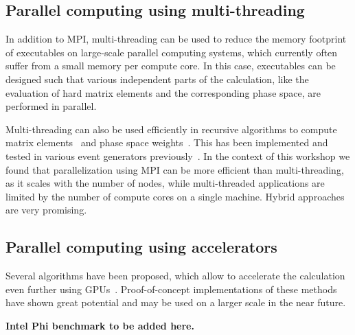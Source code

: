 \documentclass[12pt]{article}
\newcommand{\todo}[1]{\textbf{\color{red}#1}}
\begin{document}
\subsection{Parallel computing using multi-threading}
In addition to MPI, multi-threading can be used to reduce the memory
footprint of executables on large-scale parallel computing systems, which
currently often suffer from a small memory per compute core. In this
case, executables can be designed such that various independent parts
of the calculation, like the evaluation of hard matrix elements and
the corresponding phase space, are performed in parallel.

Multi-threading can also be used efficiently in recursive algorithms
to compute matrix elements~\cite{Berends:1987me} and phase space 
weights~\cite{Byckling:1969sx}. This has been implemented and tested
in various event generators previously~\cite{Gleisberg:2008fv,Giele:2010ks}.  
In the context of this workshop we found that parallelization using MPI 
can be more efficient than multi-threading, as it scales with the number 
of nodes, while multi-threaded applications are limited by the number of 
compute cores on a single machine.  Hybrid approaches are very promising.

\subsection{Parallel computing using accelerators}
Several algorithms have been proposed, which allow to accelerate the
calculation even further using
GPUs~\cite{Hagiwara:2009aq,Giele:2010ks,Hagiwara:2013oka}.
Proof-of-concept implementations of these methods have shown great
potential and may be used on a larger scale in the near future.

\todo{Intel Phi benchmark to be added here.}
\end{document}
